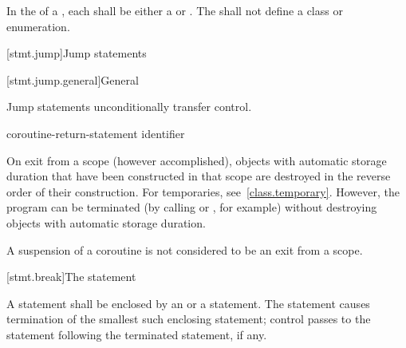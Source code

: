 \pnum
In the  of a ,
each  shall be either a 
or . The  shall not define a
class or enumeration.%

[stmt.jump]{Jump statements}%

[stmt.jump.general]{General}%

\pnum
Jump statements unconditionally transfer control.
%

%
%
%
%
%
%
\begin{bnf}
\br
     \terminal{;}\br
     \terminal{;}\br
      \terminal{;}\br
    coroutine-return-statement\br
     identifier \terminal{;}
\end{bnf}

\pnum
{}%
%
\begin{note}
On exit from a scope (however accomplished), objects with automatic storage
duration that have been constructed in that scope are destroyed
in the reverse order of their construction.
For temporaries, see~\ref{class.temporary}.
However, the program can be terminated (by calling
%
%
 or
%
%
, for example) without
destroying objects with automatic storage duration.
\end{note}
\begin{note}
A suspension of a coroutine is not considered to be an exit from a scope.
\end{note}

[stmt.break]{The  statement}%

\pnum
A  statement shall be enclosed by
%
%
an  or
a  statement.
The  statement causes
termination of the smallest such enclosing statement;
control passes to the statement following the
terminated statement, if any.

